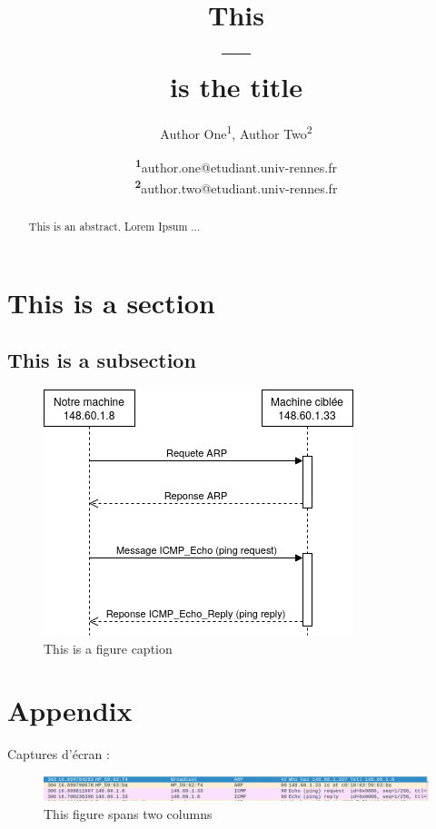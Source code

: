 \documentclass[
	a4paper, %
	12pt, %
	unnumberedsections, %
	twoside, %
    xcolor = {dvipsnames}
]{class}
\title{This\\---\\ is the title} %
\author{%
	Author One\textsuperscript{1}, Author Two\textsuperscript{2}
}
\date{\footnotesize\textsuperscript{\textbf{1}}author.one@etudiant.univ-rennes.fr\\\footnotesize\textsuperscript{\textbf{2}}author.two@etudiant.univ-rennes.fr}
\begin{document}
\maketitle

\begin{abstract}
    \noindent This is an abstract. Lorem Ipsum ...
\end{abstract}

\section{This is a section}
\subsection{This is a subsection}


\begin{figure}[H] %
    \includegraphics[width=\linewidth]{assets/sequence.png}
	\caption{This is a figure caption}
	\label{fig:sequence-ARP-ICMP}
\end{figure}

\pagebreak
\section{Appendix}\label{appendices}
Captures d'écran :
\begin{figure}[H] %
    \includegraphics[width=2\linewidth]{assets/wireshark-screen-ARP-ICMP.png}
    \caption{This figure spans two columns}
    \label{fig:screen-wireshark-ARP-ICMP}
\end{figure}
\end{document}
